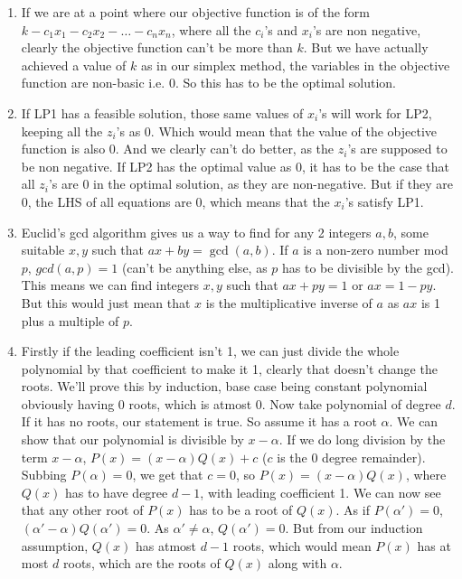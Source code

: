 \documentclass[12pt]{report}
\begin{document}
\begin{enumerate}[label=\textbf{\arabic*.}]
    \item If we are at a point where our objective function is of the form $k - c_1 x_1 - c_2 x_2 - \dots - c_n x_n$, where 
    all the $c_i$'s and $x_i$'s are non negative, clearly the objective function can't be more than $k$. But we have actually
    achieved a value of $k$ as in our simplex method, the variables in the objective function are non-basic i.e. $0$. So 
    this has to be the optimal solution.

    \item If LP1 has a feasible solution, those same values of $x_i$'s will work for LP2, keeping all the $z_i$'s as $0$.
    Which would mean that the value of the objective function is also $0$. And we clearly can't do better, as the $z_i$'s 
    are supposed to be non negative. If LP2 has the optimal value as $0$, it has to be the case that all $z_i$'s are $0$ 
    in the optimal solution, as they are non-negative. But if they are $0$, the LHS of all equations are 0, which means 
    that the $x_i$'s satisfy LP1.
    
    \item Euclid's gcd algorithm gives us a way to find for any 2 integers $a, b$, some suitable $x, y$ such that $ax + by = \gcd(a,b)$.
    If $a$ is a non-zero number mod $p$, $gcd(a,p) = 1$ (can't be anything else, as $p$ has to be divisible by the gcd).
    This means we can find integers $x, y$ such that $ax + py = 1$ or $ax = 1 - py$. But this would just mean that $x$ 
    is the multiplicative inverse of $a$ as $ax$ is 1 plus a multiple of $p$.
    
    \item Firstly if the leading coefficient isn't 1, we can just divide the whole polynomial by that coefficient to make 
    it 1, clearly that doesn't change the roots. We'll prove this by induction, base case being constant polynomial obviously
    having $0$ roots, which is atmost $0$. Now take polynomial of degree $d$. If it has no roots, our statement is true.
    So assume it has a root $\alpha$. We can show that our polynomial is divisible by $x - \alpha$. If we do long division
    by the term $x - \alpha$, $P(x) = (x - \alpha)Q(x) + c$ ($c$ is the 0 degree remainder). Subbing $P(\alpha) = 0$, we get that 
    $c = 0$, so $P(x) = (x - \alpha)Q(x)$, where $Q(x)$ has to have degree $d-1$, with leading coefficient 1. We can now see 
    that any other root of $P(x)$ has to be a root of $Q(x)$. As if $P(\alpha') = 0$, $(\alpha' - \alpha)Q(\alpha') = 0$. As
    $\alpha' \neq \alpha$, $Q(\alpha') = 0$. But from our induction assumption, $Q(x)$ has atmost $d-1$ roots, which would mean 
    $P(x)$ has at most $d$ roots, which are the roots of $Q(x)$ along with $\alpha$.


\end{enumerate}
\end{document}
